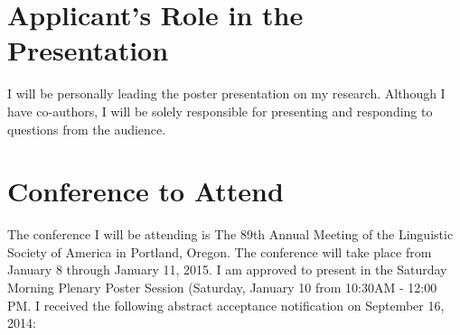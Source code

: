 \documentclass[12pt, oneside]{article}   	%
\begin{document}
\section{Applicant's Role in the Presentation} I will be personally leading the poster presentation on my research. Although I have co-authors, I will be solely responsible for presenting and responding to questions from the audience.
\section{Conference to Attend} The conference I will be attending is The 89th Annual Meeting of the Linguistic Society of America in Portland, Oregon. The conference will take place from January 8 through January 11, 2015. I am approved to present in the Saturday Morning Plenary Poster Session (Saturday, January 10 from 10:30AM - 12:00 PM. I received the following abstract acceptance notification on September 16, 2014:
\end{document}
